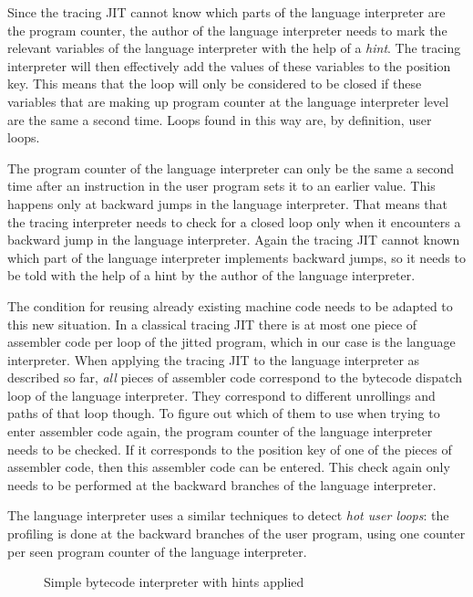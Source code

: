\documentclass{acm_proc_article-sp}
\begin{document}
Since the tracing JIT cannot know which parts of the language interpreter are
the program counter, the author of the language interpreter needs to mark the
relevant variables of the language interpreter with the help of a \emph{hint}.
The tracing interpreter will then effectively add the values of these variables
to the position key. This means that the loop will only be considered to be
closed if these variables that are making up program counter at the language
interpreter level are the same a second time.  Loops found in this way are, by
definition, user loops.

The program counter of the language interpreter can only be the same a
second time after an instruction in the user program sets it to an earlier
value. This happens only at backward jumps in the language interpreter. That
means that the tracing interpreter needs to check for a closed loop only when it
encounters a backward jump in the language interpreter. Again the tracing JIT
cannot known which part of the language interpreter implements backward jumps,
so it needs to be told with the help of a hint by the author of the language
interpreter.

The condition for reusing already existing machine code needs to be adapted to
this new situation. In a classical tracing JIT there is at most one piece of
assembler code per loop of the jitted program, which in our case is the language
interpreter. When applying the tracing JIT to the language interpreter as
described so far, \emph{all} pieces of assembler code correspond to the bytecode
dispatch loop of the language interpreter. They correspond to different
unrollings and paths of that loop though. To figure out which of them to use
when trying to enter assembler code again, the program counter of the language
interpreter needs to be checked. If it corresponds to the position key of one of
the pieces of assembler code, then this assembler code can be entered. This
check again only needs to be performed at the backward branches of the language
interpreter.

The language interpreter uses a similar techniques to detect \emph{hot user
loops}: the profiling is done at the backward branches of the user program,
using one counter per seen program counter of the language interpreter.

\begin{figure}

\caption{Simple bytecode interpreter with hints applied}
\label{fig:tlr-full}
\end{figure}
\end{document}
